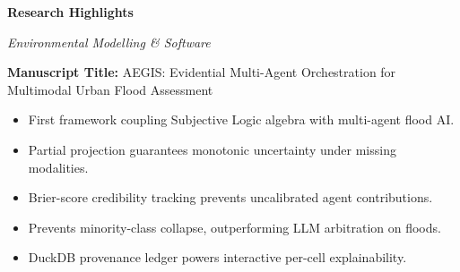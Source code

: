 \documentclass[11pt,a4paper]{article}
\begin{document}
\thispagestyle{empty}

\begin{center}
{\Large \bf Research Highlights \par}
\vspace{0.5em}
{\large \textit{Environmental Modelling \& Software} \par}
\end{center}

\vspace{1.5em}

\noindent \textbf{Manuscript Title:} AEGIS: Evidential Multi-Agent Orchestration for Multimodal Urban Flood Assessment

\vspace{1.5em}

\begin{itemize}[leftmargin=*,itemsep=1em]
    \item First framework coupling Subjective Logic algebra with multi-agent flood AI.
    \item Partial projection guarantees monotonic uncertainty under missing modalities.
    \item Brier-score credibility tracking prevents uncalibrated agent contributions.
    \item Prevents minority-class collapse, outperforming LLM arbitration on floods.
    \item DuckDB provenance ledger powers interactive per-cell explainability.
\end{itemize}
\end{document}
